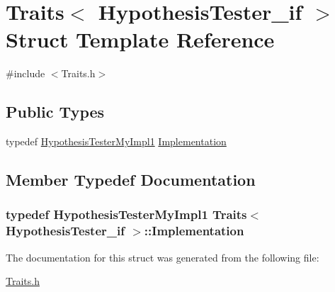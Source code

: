 \hypertarget{struct_traits_3_01_hypothesis_tester__if_01_4}{\section{Traits$<$ Hypothesis\-Tester\-\_\-if $>$ Struct Template Reference}
\label{struct_traits_3_01_hypothesis_tester__if_01_4}
}


{\ttfamily \#include $<$Traits.\-h$>$}

\subsection*{Public Types}
\begin{DoxyCompactItemize}
\item 
typedef \hyperlink{class_hypothesis_tester_my_impl1}{Hypothesis\-Tester\-My\-Impl1} \hyperlink{struct_traits_3_01_hypothesis_tester__if_01_4_a5fd3508bb7c3e86b2b16161c70eae52f}{Implementation}
\end{DoxyCompactItemize}


\subsection{Member Typedef Documentation}
\hypertarget{struct_traits_3_01_hypothesis_tester__if_01_4_a5fd3508bb7c3e86b2b16161c70eae52f}{
\subsubsection[{Implementation}]{\setlength{\rightskip}{0pt plus 5cm}typedef {\bf Hypothesis\-Tester\-My\-Impl1} {\bf Traits}$<$ {\bf Hypothesis\-Tester\-\_\-if} $>$\-::{\bf Implementation}}}\label{struct_traits_3_01_hypothesis_tester__if_01_4_a5fd3508bb7c3e86b2b16161c70eae52f}


The documentation for this struct was generated from the following file\-:\begin{DoxyCompactItemize}
\item 
\hyperlink{_traits_8h}{Traits.\-h}\end{DoxyCompactItemize}

